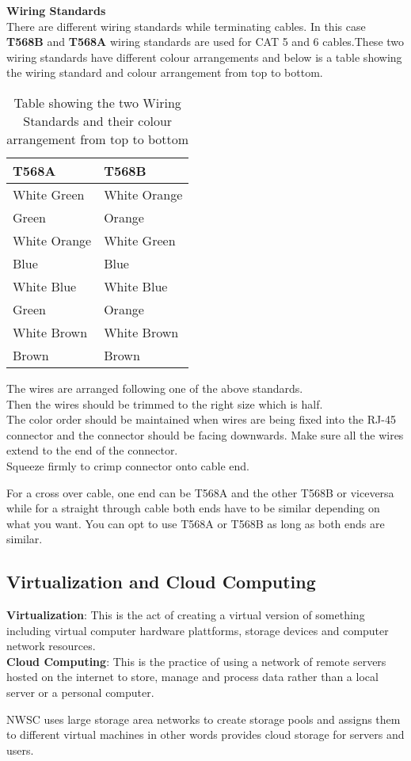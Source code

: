 \documentclass{article}
\begin{document}
\textbf{Wiring Standards}\\
There are different wiring standards while terminating cables. In this case \textbf{T568B} and \textbf{T568A} wiring standards are used for CAT 5 and 6 cables.These two wiring standards have different colour arrangements and below is a table showing the wiring standard  and colour arrangement from top to bottom.
\begin{table}[H]
\centering
\begin{tabu} to 0.8\textwidth { | X[c] | X[c] | }
 \hline
 \textbf{T568A} & \textbf{T568B}\\
 \hline
 White Green & White Orange\\
\hline
 Green & Orange \\
\hline
 White Orange & White Green\\
\hline
 Blue & Blue\\
\hline
 White Blue & White Blue\\
\hline
 Green  & Orange\\
\hline
 White Brown & White Brown\\
\hline
Brown & Brown\\
\hline
\end{tabu}
\caption{Table showing the two Wiring Standards and their colour arrangement from top to bottom}
\label{table:3}
\end{table}
The wires are arranged following one of the above standards.\\
Then the wires should be trimmed to the right size which is half.\\
The color order should be maintained when wires are being fixed into the RJ-45 connector and the connector should be facing downwards. Make sure all the wires extend to the end of the connector.\\
Squeeze firmly to crimp connector onto cable end.
\par For a cross over cable, one end can be T568A and the other T568B or viceversa while for a straight through cable both ends have to be similar depending on what you want. You can opt to use T568A or T568B as long as both ends are similar.
\subsection{Virtualization and Cloud Computing}
\textbf{Virtualization}: This is the act of creating a virtual version of something including virtual computer hardware plattforms, storage devices and computer network resources.\cite{ruest2009virtualization}\\
\textbf{Cloud Computing}: This is the practice of using a network of remote servers hosted on the internet to store, manage and process data rather than a local server or a personal computer.
\par NWSC  uses large storage area networks to create storage pools and assigns them to different virtual machines in other words provides cloud storage for servers and users.
\end{document}
